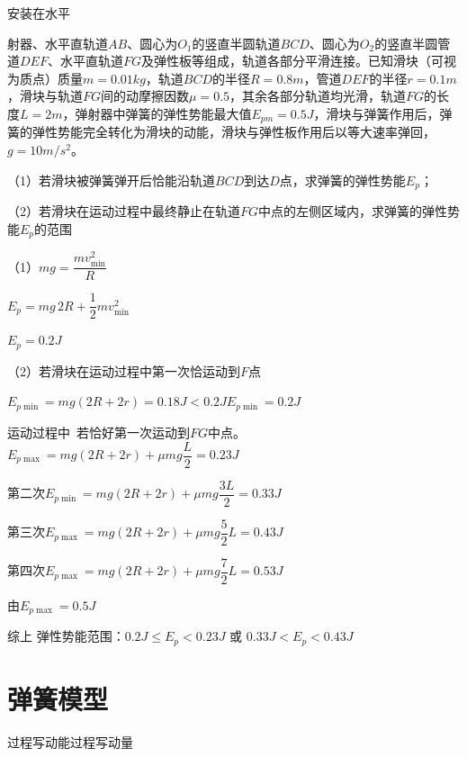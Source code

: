 \begin{problem}
安装在水平%

射器、水平直轨道$AB$、圆心为$O_1$的竖直半圆轨道$BCD$、圆心为$O_2$的竖直半圆管道$DEF$、水平直轨道$FG$及弹性板等组成，轨道各部分平滑连接。已知滑块（可视为质点）质量$m=0.01\unit{kg}$，轨道$BCD$的半径$R=0.8\unit{m}$，管道$DEF$的半径$r=0.1\unit{m}$，滑块与轨道$FG$间的动摩擦因数$\mu=0.5$，其余各部分轨道均光滑，轨道$FG$的长度$L=2\unit{m}$，弹射器中弹簧的弹性势能最大值$E_{pm}=0.5\unit{J}$，滑块与弹簧作用后，弹簧的弹性势能完全转化为滑块的动能，滑块与弹性板作用后以等大速率弹回，$g=10\unit{m/s^2}$。

（1）若滑块被弹簧弹开后恰能沿轨道$BCD$到达$D$点，求弹簧的弹性势能$E_p$；

（2）若滑块在运动过程中最终静止在轨道$FG$中点的左侧区域内，求弹簧的弹性势能$E_p$的范围
\begin{solution}
（1）$mg=\dfrac{mv_{\min}^2}{R}$

$E_p=mg\,2R+\dfrac{1}{2}mv_{\min}^2$

$E_p=0.2\unit{J}$

（2）若滑块在运动过程中第一次恰运动到$F$点

$E_{p\min}=mg(2R+2r)=0.18\unit{J}<0.2\unit{J}$\qquad $E_{p\min}=0.2\unit{J}$

运动过程中\ 若恰好第一次运动到$FG$中点。\ $E_{p\max}=mg(2R+2r)+\mu mg\dfrac{L}{2}=0.23\unit{J}$%

第二次\quad $E_{p\min}=mg(2R+2r)+\mu mg\dfrac{3L}{2}=0.33\unit{J}$

第三次\quad $E_{p\max}=mg(2R+2r)+\mu mg\dfrac{5}{2}L=0.43\unit{J}$

第四次\quad $E_{p\max}=mg(2R+2r)+\mu mg\dfrac{7}{2}L=0.53\unit{J}$

由$E_{p\max}=0.5\unit{J}$

综上 弹性势能范围：$0.2\unit{J}\le E_p<0.23\unit{J}$ 或 $0.33\unit{J}<E_p<0.43\unit{J}$
\end{solution}
\end{problem}


\section{弹簧模型}
过程写动能\qquad 过程写动量

